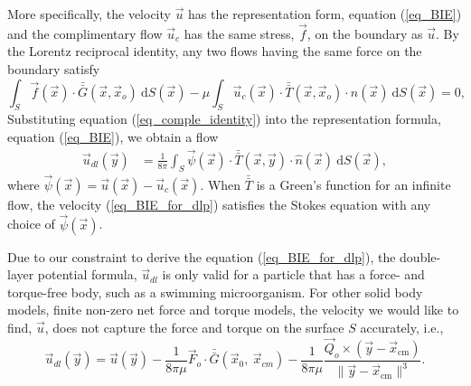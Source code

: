 More specifically, the velocity $\vec{u}$  has the representation form, equation (\ref{eq_BIE}) and the complimentary flow $\vec{u}_c$ has the same stress, $\vec{f}$, on the boundary as $\vec{u}$. By the Lorentz reciprocal identity, any two flows having the same force on the boundary satisfy
\begin{equation}
	\int_{S}  \vec{f}(\vec{x}) \cdot \bar{\bar{G}}(\vec{x},\vec{x}_o) \ \text{d}S(\vec{x})  
	- \mu \int_S
	  \vec{u}_c(\vec{x}) \cdot  \bar{\bar{T}}(\vec{x},\vec{x}_o) 
	  \cdot \hat{n} ( \vec{x})
	  \ \text{d}S(\vec{x})
	  =0,
	  \label{eq_comple_identity}
\end{equation}
Substituting equation (\ref{eq_comple_identity}) into the representation formula, equation (\ref{eq_BIE}), we obtain a flow
\begin{align}
   \vec{u}_{dl}(\vec{y}) & =
	\frac{1}{8 \pi } \int_S  
	\vec{\psi}(\vec{x})
	\cdot  \bar{\bar{T}}(\vec{x},\vec{y})  
	\cdot \hat{n} ( \vec{x})
	\ \text{d}S(\vec{x}),
\label{eq_BIE_for_dlp}
\end{align}
where $
	\vec{\psi}(\vec{x}) =    \vec{u}(\vec{x})  - \vec{u}_c (\vec{x})$.
When $\bar{\bar{T }}$ is a Green's function for an infinite flow, the velocity (\ref{eq_BIE_for_dlp}) satisfies the Stokes equation with any choice of $\vec{\psi}(\vec{x}) $.
\par
%
Due to our constraint to derive the equation (\ref{eq_BIE_for_dlp}), the double-layer potential formula, $\vec{u}_{dl}$ is only valid for a particle that has a force- and torque-free body, such as a swimming microorganism.
For other solid body models, finite non-zero net force and torque models, the velocity we would like to find, $\vec{u}$, does not capture the force and torque on the surface $S$ accurately, i.e., 
\begin{equation}
\vec{u}_{dl}(\vec{y}) = \vec{u}(\vec{y}) 
- \frac{1}{8 \pi \mu }\vec{F}_o \cdot \bar{\bar{G}}(\vec{x}_{0}, \ \vec{x}_{cm})
- \frac{1}{8 \pi \mu } \frac{\vec{Q}_o \times  (\vec{y}   - \vec{x}_{\text{cm}} ) }{\| \vec{y}   - \vec{x}_{\text{cm}} \|^3 }.
\label{eq_v_dlp}
\end{equation}
